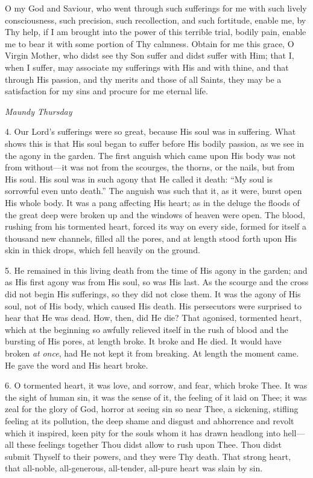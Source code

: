O my God and Saviour, who went
through such sufferings for me with such lively consciousness, such
precision, such recollection, and such fortitude, enable me, by Thy
help, if I am brought into the power of this terrible trial, bodily
pain, enable me to bear it with some portion of Thy calmness. Obtain for
me this grace, O Virgin Mother, who didst see thy Son suffer and didst
suffer with Him; that I, when I suffer, may associate my sufferings with
His and with thine, and that through His passion, and thy merits and
those of all Saints, they may be a satisfaction for my sins and procure
for me eternal life.

\emph{Maundy
Thursday}

4. Our Lord's sufferings were so
great, because His soul was in suffering. What shows this is that His
soul began to suffer before His bodily passion, as we see in the agony
in the garden. The first anguish which came upon His body was not from
without—it was not from the scourges, the thorns, or the nails, but
from His soul. His soul was in such agony that He called it death: ``My
soul is sorrowful even unto death.'' The anguish was such that it, as it
were, burst open His whole body. It was a pang affecting His
heart; as in the deluge the floods of the great deep were broken up and
the windows of heaven were open. The blood, rushing from his tormented
heart, forced its way on every side, formed for itself a thousand new
channels, filled all the pores, and at length stood forth upon His skin
in thick drops, which fell heavily on the ground.

5. He remained in this living
death from the time of His agony in the garden; and as His first agony
was from His soul, so was His last. As the scourge and the cross did not
begin His sufferings, so they did not close them. It was the agony of
His soul, not of His body, which caused His death. His persecutors were
surprised to hear that He was dead. How, then, did He die? That agonised,
tormented heart, which at the beginning so awfully relieved itself in
the rush of blood and the bursting of His pores, at length broke. It
broke and He died. It would have broken \emph{at} \emph{once}, had He
not kept it from breaking. At length the moment came. He gave the word
and His heart broke.

6. O tormented heart, it was
love, and sorrow, and fear, which broke Thee. It was the sight of human
sin, it was the sense of it, the feeling of it laid on Thee; it was zeal
for the glory of God, horror at seeing sin so near Thee, a sickening,
stifling feeling at its pollution, the deep shame and disgust and
abhorrence and revolt which it inspired, keen pity for the souls whom it
has drawn headlong into hell—all these feelings together Thou didst
allow to rush upon Thee. Thou didst submit Thyself to their
powers, and they were Thy death. That strong heart, that all-noble,
all-generous, all-tender, all-pure heart was slain by sin.

